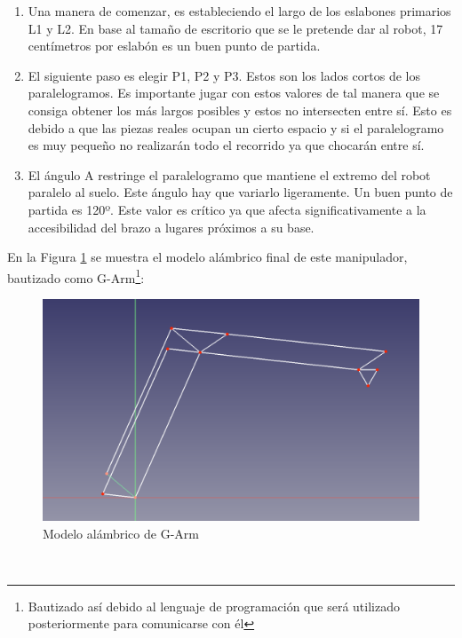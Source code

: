 \begin{enumerate}
\item Una manera de comenzar, es estableciendo el largo de los eslabones primarios L1 y L2. En base al tamaño de escritorio que se le pretende 
dar al robot, 17 centímetros por eslabón es un buen punto de partida.
\item El siguiente paso es elegir P1, P2 y P3. Estos son los lados cortos de los paralelogramos. Es importante jugar con estos valores 
de tal manera que se consiga obtener los más largos posibles y estos no intersecten entre sí. Esto es debido a que las piezas reales ocupan un cierto espacio y si el paralelogramo es 
muy pequeño no realizarán todo el recorrido ya que chocarán entre sí. 
\item El ángulo A restringe el paralelogramo que mantiene el extremo del robot paralelo al suelo. Este ángulo hay que variarlo ligeramente. Un buen 
punto de partida es 120º. Este valor es crítico ya que afecta significativamente a la accesibilidad del brazo a lugares próximos a su base. 
\end{enumerate}
\newpage
En la Figura \ref{fig:g_arm_alambrico} se muestra el modelo alámbrico final de este manipulador, bautizado como G-Arm\footnote{Bautizado así 
debido al lenguaje de programación que será utilizado posteriormente para comunicarse con él}:\\
\begin{figure} [ht!]
  \begin{center}
    \includegraphics[width=15cm]{figs/alambrico_garm.png}
  \end{center}
  \caption{Modelo alámbrico de G-Arm}
  \label{fig:g_arm_alambrico}
\end{figure}\ 

